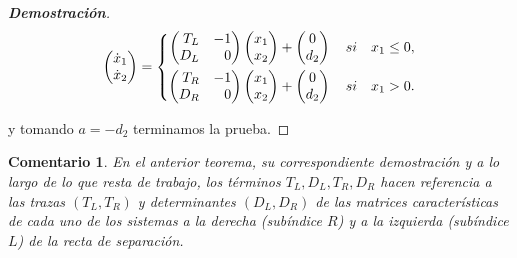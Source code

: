 \documentclass[12pt,a4paper]{report} %
\newtheorem{comentario}{Comentario}
\begin{document}
\begin{proof}[\textbf{Demostración}]
	\begin{equation}
		\begin{pmatrix*}[r]
			\dot{x}_1 \\ \dot{x}_2
		\end{pmatrix*}=
		\label{eq:lienard2}
		\scalebox{1}{$\displaystyle
			\left\{
			\begin{aligned}
				\begin{pmatrix*}[r]
					T_L & -1\\
					D_L & 0
				\end{pmatrix*}\begin{pmatrix*}[r]
				x_1 \\ x_2
				\end{pmatrix*}+\begin{pmatrix}
					0\\d_2
				\end{pmatrix} \quad si \quad x_1\leq 0, \\
				\begin{pmatrix*}[r]
					T_R & -1\\
					D_R & 0
				\end{pmatrix*}\begin{pmatrix*}[r]
				x_1 \\ x_2
				\end{pmatrix*}+\begin{pmatrix}
					0\\d_2
				\end{pmatrix} \quad si \quad x_1 > 0.
			\end{aligned}
			\right. 
			$}
	\end{equation}\smallskip

	\noindent y tomando $a=-d_2$ terminamos la prueba.
\end{proof}

\vspace{0.5cm}\begin{comentario}
	En el anterior teorema, su correspondiente demostración y a lo largo de lo que resta de trabajo, los términos $T_L,D_L,T_R,D_R$ hacen referencia a las trazas $(T_L,T_R)$ y determinantes $(D_L,D_R)$ de las matrices características de cada uno de los sistemas a la derecha (subíndice $R$) y a la izquierda (subíndice $L$) de la recta de separación.
\end{comentario}\smallskip
\end{document}

